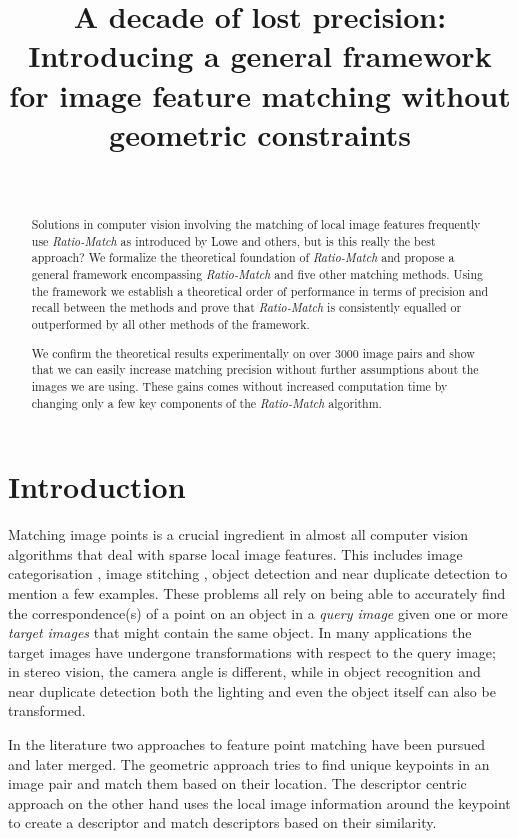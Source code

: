 \documentclass[journal]{IEEEtran}
\title{A decade of lost precision: Introducing a general framework for 
image feature matching without geometric constraints}
\author{%
\IEEEauthorblockN{%
Jonas Toft Arnfred,\IEEEauthorrefmark{1} Stefan 
Winkler,\IEEEauthorrefmark{1} Sabine S\"usstrunk\IEEEauthorrefmark{2}}\\
\vspace{1mm}
\IEEEauthorblockA{%
\IEEEauthorrefmark{1}~Advanced Digital Sciences Center (ADSC), University of Illinois at Urbana-Champaign (UIUC), Singapore\\
\IEEEauthorrefmark{2}~\'Ecole Polytechnique F\'ed\'erale de Lausanne (EPFL), Switzerland}
}
\begin{document}
\maketitle
%
\begin{abstract}
Solutions in computer vision involving the matching of local image 
features frequently use \emph{Ratio-Match} as introduced by Lowe and 
others, but is this really the best approach? We formalize the 
theoretical foundation of \emph{Ratio-Match} and propose a general 
framework encompassing \emph{Ratio-Match} and five other matching 
methods. Using the framework we establish a theoretical order of 
performance in terms of precision and recall between the methods and 
prove that \emph{Ratio-Match} is consistently equalled or outperformed 
by all other methods of the framework.

We confirm the theoretical results experimentally on over 3000 image 
pairs and show that we can easily increase matching precision
without further assumptions about the images we are using. These gains 
comes without increased computation time by changing only a few key 
components of the \emph{Ratio-Match} algorithm.

\end{abstract}
%
\section{Introduction}
%
Matching image points is a crucial ingredient in almost all computer 
vision algorithms that deal with sparse local image features. This 
includes image categorisation \cite{bosch2008scene}, image stitching 
\cite{brown2007automatic}, object detection \cite{zhang2007local} and 
near duplicate detection \cite{zhao2009scale} to mention a few examples.  
These problems all rely on being able to accurately find the 
correspondence(s) of a point on an object in a \emph{query image} given 
one or more \emph{target images} that might contain the same object.  In 
many applications the target images have undergone transformations with 
respect to the query image; in stereo vision, the camera angle is 
different, while in object recognition and near duplicate detection both 
the lighting and even the object itself can also be transformed.

In the literature two approaches to feature point matching have been 
pursued and later merged. The geometric approach tries to find unique 
keypoints in an image pair and match them based on their location.  The 
descriptor centric approach on the other hand uses the local image 
information around the keypoint to create a descriptor and match 
descriptors based on their similarity.
\end{document}
